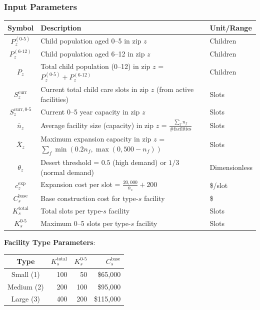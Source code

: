 \documentclass[12pt]{article}
\begin{document}
\subsubsection{Input Parameters}

\begin{table}[h]
\centering
\begin{tabular}{|c|p{8cm}|p{4cm}|}
\hline
\textbf{Symbol} & \textbf{Description} & \textbf{Unit/Range} \\
\hline
$P_z^{(0\text{-}5)}$ & Child population aged 0--5 in zip $z$ & Children \\
\hline
$P_z^{(6\text{-}12)}$ & Child population aged 6--12 in zip $z$ & Children \\
\hline
$P_z$ & Total child population (0--12) in zip $z$ = $P_z^{(0\text{-}5)} + P_z^{(6\text{-}12)}$ & Children \\
\hline
$S_z^{\text{curr}}$ & Current total child care slots in zip $z$ (from active facilities) & Slots \\
\hline
$S_z^{\text{curr}, 0\text{-}5}$ & Current 0--5 year capacity in zip $z$ & Slots \\
\hline
$\bar{n}_z$ & Average facility size (capacity) in zip $z$ = $\frac{\sum_f n_f}{\text{\# facilities}}$ & Slots \\
\hline
$\overline{X}_z$ & Maximum expansion capacity in zip $z$ = $\sum_f \min(0.2 n_f, \max(0, 500 - n_f))$ & Slots \\
\hline
$\theta_z$ & Desert threshold = $0.5$ (high demand) or $1/3$ (normal demand) & Dimensionless \\
\hline
$c_z^{\text{exp}}$ & Expansion cost per slot = $\frac{20{,}000}{\bar{n}_z} + 200$ & \$/slot \\
\hline
$C_s^{\text{base}}$ & Base construction cost for type-$s$ facility & \$ \\
\hline
$K_s^{\text{total}}$ & Total slots per type-$s$ facility & Slots \\
\hline
$K_s^{0\text{-}5}$ & Maximum 0--5 slots per type-$s$ facility & Slots \\
\hline
\end{tabular}
\end{table}

\noindent
\textbf{Facility Type Parameters}:

\begin{table}[h]
\centering
\begin{tabular}{|c|r|r|r|}
\hline
\textbf{Type} & \textbf{$K_s^{\text{total}}$} & \textbf{$K_s^{0\text{-}5}$} & \textbf{$C_s^{\text{base}}$} \\
\hline
Small (1) & 100 & 50 & \$65{,}000 \\
\hline
Medium (2) & 200 & 100 & \$95{,}000 \\
\hline
Large (3) & 400 & 200 & \$115{,}000 \\
\hline
\end{tabular}
\end{table}
\end{document}
